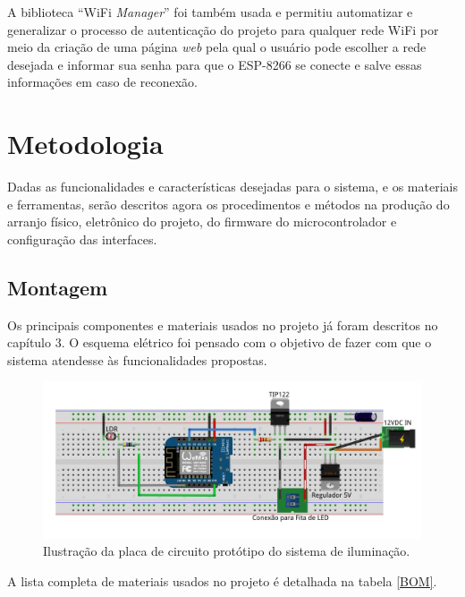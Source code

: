 A biblioteca ``WiFi \textit{Manager}'' \cite{wifimng} foi também usada e permitiu automatizar e generalizar o processo de autenticação do projeto para qualquer rede WiFi por meio da criação de uma página \textit{web} pela qual o usuário pode escolher a rede desejada e informar sua senha para que o ESP-8266 se conecte e salve essas informações em caso de reconexão.

\section{Metodologia}

Dadas as funcionalidades e características desejadas para o sistema, e os materiais e ferramentas, serão descritos agora os procedimentos e métodos na produção do arranjo físico, eletrônico do projeto, do firmware do microcontrolador e configuração das interfaces.

\subsection{Montagem}

Os principais componentes e materiais usados no projeto já foram descritos no capítulo 3. O esquema elétrico foi pensado com o objetivo de fazer com que o sistema atendesse às funcionalidades propostas.

\begin{figure}[ht]
    \begin{center}
    \includegraphics[width=\textwidth]{figuras/fritzproto.PNG}
    \end{center}
    \caption[Ilustração da placa de circuito protótipo do sistema de iluminação.]{Ilustração da placa de circuito protótipo do sistema de iluminação.}
    \label{fproto}
\end{figure}

A lista completa de materiais usados no projeto é detalhada na tabela \ref{BOM}.

